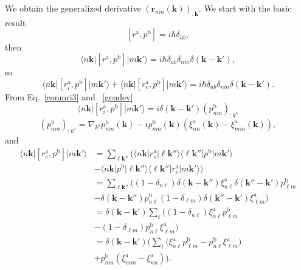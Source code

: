 We obtain the generalized derivative $(\mathbf{r}_{nm}(\mathbf{k}))_{;\mathbf{k}}$.
We start with the basic result
\begin{equation}\label{a_hrdab}
[r^{\mathrm{a}},p^{\mathrm{b}}]=i\hbar\delta_{ab}
,
\end{equation} 
then
\begin{equation}\label{a_hrdab2}
\langle n\mathbf{k}\vert[r^{\mathrm{a}},p^{\mathrm{b}}]\vert m\mathbf{k}'\rangle=i\hbar\delta_{ab}\delta_{nm}\delta(\mathbf{k}-\mathbf{k}')
,
\end{equation}
so
\begin{equation}\label{a_hrdab3}
\langle n\mathbf{k}\vert[r^{\mathrm{a}}_i,p^{\mathrm{b}}]\vert m\mathbf{k}'\rangle
+
\langle n\mathbf{k}\vert[r^{\mathrm{a}}_e,p^{\mathrm{b}}]\vert m\mathbf{k}'\rangle
=i\hbar\delta_{ab}\delta_{nm}\delta(\mathbf{k}-\mathbf{k}')
.
\end{equation}
From Eq.~\eqref{conmri3} and ~\eqref{gendev}
\begin{equation}\label{a_rip}
\langle n\mathbf{k}\vert[r^{\mathrm{a}}_i,p^{\mathrm{b}}]\vert m\mathbf{k}'\rangle
=i\delta(\mathbf{k}-\mathbf{k}')(p^{\mathrm{b}}_{nm})_{;k^{\mathrm{a}}}
\end{equation}
\begin{equation}\label{a_ripn}
(p^{\mathrm{b}}_{nm})_{;k^{\mathrm{a}}}=
\nabla_{k^{\mathrm{a}}}
p^{\mathrm{b}}_{n m}(\mathbf{k})
-
i
p^{\mathrm{b}}_{nm}(\mathbf{k})
\left(
\xi^{\mathrm{a}}_{nn}(\mathbf{k})
-
\xi^{\mathrm{a}}_{mm}(\mathbf{k})
\right)
,
\end{equation}
and
\begin{align}\label{a_rep}
\langle n\mathbf{k}\vert[r^{\mathrm{a}}_e,p^{\mathrm{b}}]\vert m\mathbf{k}'\rangle&=
\sum_{\ell\mathbf{k}''}
\bigg(
\langle n\mathbf{k}\vert r^{\mathrm{a}}_e\vert\ell\mathbf{k}''\rangle\langle\ell\mathbf{k}''\vert p^{\mathrm{b}}\vert m\mathbf{k}'\rangle
\nonumber \\
&
-
\langle n\mathbf{k}\vert p^{\mathrm{b}}\vert\ell\mathbf{k}''\rangle\langle\ell\mathbf{k}''\vert r^{\mathrm{a}}_e\vert m\mathbf{k}'\rangle
\bigg)
\nonumber \\
&=
\sum_{\ell\mathbf{k}''}
\bigg(
(1-\delta_{n\ell})\delta(\mathbf{k}-\mathbf{k}'')\xi^{\mathrm{a}}_{n\ell}
\delta(\mathbf{k}''-\mathbf{k}')p^{\mathrm{b}}_{\ell m}
\nonumber \\
&-
\delta(\mathbf{k}-\mathbf{k}'')p^{\mathrm{b}}_{n\ell}
(1-\delta_{\ell m})\delta(\mathbf{k}''-\mathbf{k}')\xi^{\mathrm{a}}_{\ell m}
\bigg)
\nonumber \\
&=
\delta(\mathbf{k}-\mathbf{k}')
\sum_{\ell}
\bigg(
(1-\delta_{n\ell})
\xi^{\mathrm{a}}_{n\ell}
p^{\mathrm{b}}_{\ell m}
\nonumber \\
&-
(1-\delta_{\ell m})
p^{\mathrm{b}}_{n\ell}
\xi^{\mathrm{a}}_{\ell m}
\bigg)
\nonumber \\
&=
\delta(\mathbf{k}-\mathbf{k}')
\bigg(
\sum_{\ell}
\bigg(
\xi^{\mathrm{a}}_{n\ell}
p^{\mathrm{b}}_{\ell m}
-
p^{\mathrm{b}}_{n\ell}
\xi^{\mathrm{a}}_{\ell m}
\bigg)
\nonumber \\
&+
p^{\mathrm{b}}_{nm}(\xi^{\mathrm{a}}_{mm}
-
\xi^{\mathrm{a}}_{nn}
)
\bigg)
.
\end{align}
